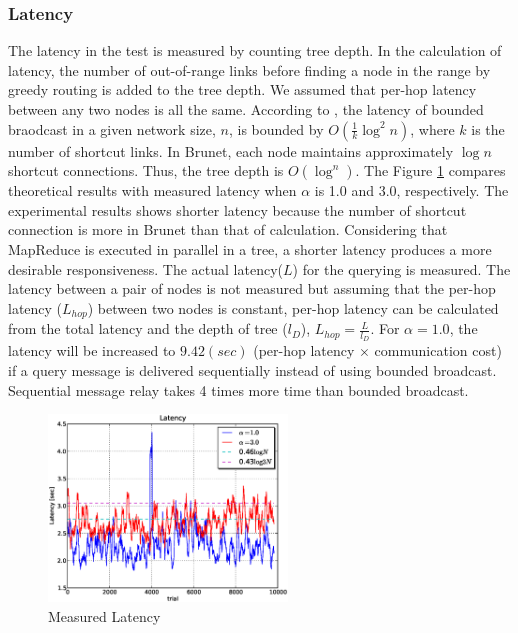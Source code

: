 \documentclass[9.5pt,journal,final,finalsubmission,twocolumn]{IEEEtran}
\begin{document}
\subsubsection{Latency}
The latency in the test is measured by counting tree depth.
In the calculation of latency, the number of out-of-range links before finding a node 
in the range by greedy routing is added to the tree depth.
We assumed that per-hop latency between any two nodes is all the same.
According to \cite{to:deetoo10}, the latency of bounded braodcast in 
a given network size, $n$, is bounded by $O(\frac{1}{k}\log^2{n})$, where $k$ is 
the number of shortcut links. In Brunet, each node maintains approximately
$\log{n}$ shortcut connections. Thus, the tree depth is $O(\log^{n})$.
The Figure \ref{fig:latency} compares theoretical results
with measured latency
when $\alpha$ is 1.0 and 3.0, respectively. The experimental results 
shows shorter latency because the number of shortcut connection 
is more in Brunet than that of calculation.
Considering that MapReduce is executed in parallel in a tree,
a shorter latency produces a more desirable responsiveness.
The actual latency($L$) for the querying is measured. The latency between 
a pair of nodes is not measured but assuming that the per-hop latency
($L_{hop}$) between two nodes is constant, 
per-hop latency can be calculated 
from the total latency and the depth of tree ($l_D$),
$L_{hop}=\frac{L}{l_D}$.
For $\alpha=1.0$, the latency will be increased to $9.42(sec)$
(per-hop latency $\times$ communication cost) if a 
query message is delivered sequentially instead of
using bounded broadcast. Sequential message relay takes 4 times more time
than bounded broadcast. 
\begin{figure}[ht]
\centering
\includegraphics[width=2.5in]{plab_latency_sec.eps}
\caption{Measured Latency} \label{fig:latency}
\end{figure}
\end{document}
